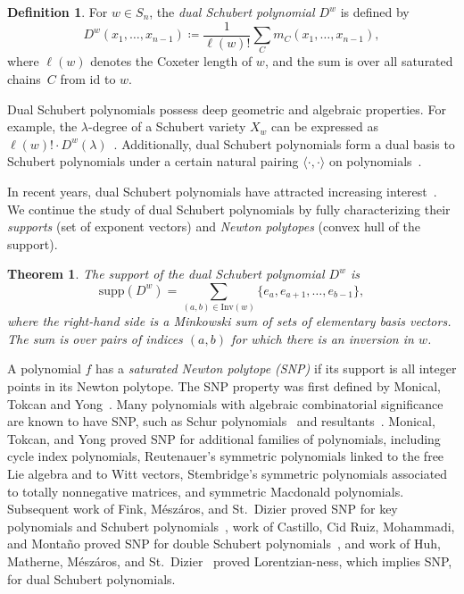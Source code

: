 \documentclass[11pt]{article}
\newtheorem{theorem}[theo]{Theorem}
\theoremstyle{definition}
\newtheorem{defi}[theo]{Definition}
\numberwithin{equation}{section}
\newcommand{\id}{\mathrm{id}}
\newcommand{\Inv}{\mathrm{Inv}}
\newcommand{\supp}{\mathrm{supp}}
\begin{document}
\begin{defi}\label{def:dualSchubert}
    For $w \in S_n$, the \emph{dual Schubert polynomial $D^w$} is defined by \[D^w(x_1, \dots,x_{n-1}) \coloneqq \frac{1}{\ell(w)!} \sum_C m_C(x_1, \dots,x_{n-1}),\] where $\ell(w)$ denotes the Coxeter length of $w$, and the sum is over all saturated chains~$C$ from $\id$ to $w$.
\end{defi}

Dual Schubert polynomials possess deep geometric and algebraic properties. For example, the $\lambda$-degree of a Schubert variety $X_w$ can be expressed as $\ell(w)! \cdot D^w(\lambda)$~\cite{PostnikovStanley}. Additionally, dual Schubert polynomials form a dual basis to Schubert polynomials under a certain natural pairing $\langle \cdot, \cdot \rangle$ on polynomials~\cite{PostnikovStanley}. 

In recent years, dual Schubert polynomials have attracted increasing interest~\cite{InvolRC, Hamaker,HuhMeszaroLorSchur}. We continue the study of dual Schubert polynomials by fully characterizing their \emph{supports} (set of exponent vectors) and \emph{Newton polytopes} (convex hull of the support).

\begin{theorem}\label{theorem:support}
    The support of the dual Schubert polynomial $D^w$ is
    \[\supp (D^w)= \sum_{(a,b) \in \Inv(w)}\{e_a, e_{a+1}, \dots, e_{b-1}\},\]
    where the right-hand side is a Minkowski sum of sets of elementary basis vectors. The sum is over pairs of indices $(a, b)$ for which there is an inversion in $w$.
\end{theorem}

A polynomial $f$ has a \textit{saturated Newton polytope (SNP)} if its support is all integer points in its Newton polytope. The SNP property was first defined by Monical, Tokcan and Yong~\cite{NewtonPolyinAC}. Many polynomials with algebraic combinatorial significance are known to have SNP, such as Schur polynomials~\cite{Rado} and resultants~\cite{GKZ}. Monical, Tokcan, and Yong proved SNP for additional families of polynomials, including cycle index polynomials, Reutenauer's symmetric polynomials linked to the free Lie algebra and to Witt vectors, Stembridge's symmetric polynomials associated to totally nonnegative matrices, and symmetric Macdonald polynomials. 
Subsequent work of Fink, M\'esz\'aros, and St.\ Dizier proved SNP for key polynomials and Schubert polynomials~\cite{FMD}, work of Castillo, Cid Ruiz, Mohammadi, and Monta\~no proved SNP for double Schubert polynomials~\cite{DoubleSchSNP}, and work of Huh, Matherne, M\'esz\'aros, and St.\ Dizier~\cite{HuhMeszaroLorSchur} proved Lorentzian-ness, which implies SNP, for dual Schubert polynomials.
\end{document}
